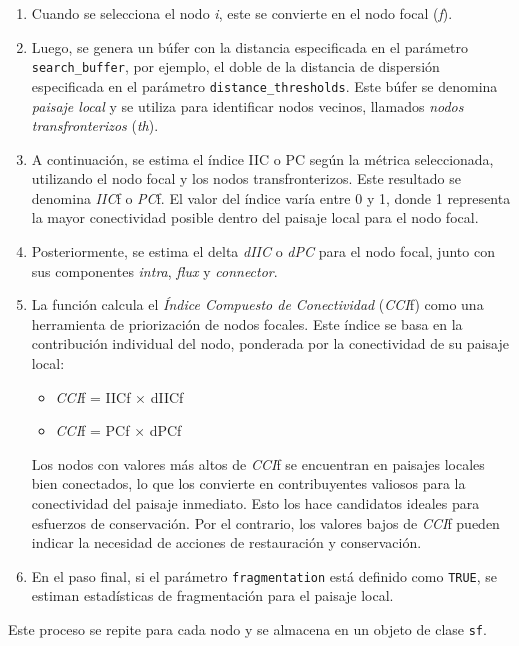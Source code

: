 \documentclass[
]{book}
\providecommand{\tightlist}{%
  \setlength{\itemsep}{0pt}\setlength{\parskip}{0pt}}
\begin{document}
\begin{enumerate}
\def\labelenumi{\arabic{enumi}.}
\item
  Cuando se selecciona el nodo \emph{i}, este se convierte en el nodo focal (\emph{f}).
\item
  Luego, se genera un búfer con la distancia especificada en el parámetro \texttt{search\_buffer}, por ejemplo, el doble de la distancia de dispersión especificada en el parámetro \texttt{distance\_thresholds}. Este búfer se denomina \emph{paisaje local} y se utiliza para identificar nodos vecinos, llamados \emph{nodos transfronterizos} (\emph{th}).
\item
  A continuación, se estima el índice IIC o PC según la métrica seleccionada, utilizando el nodo focal y los nodos transfronterizos. Este resultado se denomina \emph{IIC}f o \emph{PC}f. El valor del índice varía entre 0 y 1, donde 1 representa la mayor conectividad posible dentro del paisaje local para el nodo focal.
\item
  Posteriormente, se estima el delta \emph{dIIC} o \emph{dPC} para el nodo focal, junto con sus componentes \emph{intra}, \emph{flux} y \emph{connector}.
\item
  La función calcula el \emph{Índice Compuesto de Conectividad} (\emph{CCI}f) como una herramienta de priorización de nodos focales. Este índice se basa en la contribución individual del nodo, ponderada por la conectividad de su paisaje local:

  \begin{itemize}
  \tightlist
  \item
    \emph{CCI}f = IICf × dIICf
  \item
    \emph{CCI}f = PCf × dPCf
  \end{itemize}

  Los nodos con valores más altos de \emph{CCI}f se encuentran en paisajes locales bien conectados, lo que los convierte en contribuyentes valiosos para la conectividad del paisaje inmediato. Esto los hace candidatos ideales para esfuerzos de conservación. Por el contrario, los valores bajos de \emph{CCI}f pueden indicar la necesidad de acciones de restauración y conservación.
\item
  En el paso final, si el parámetro \texttt{fragmentation} está definido como \texttt{TRUE}, se estiman estadísticas de fragmentación para el paisaje local.
\end{enumerate}

Este proceso se repite para cada nodo y se almacena en un objeto de clase \texttt{sf}.
\end{document}
